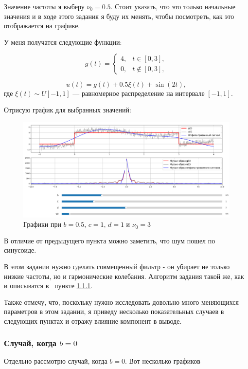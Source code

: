 \documentclass[a4paper,12pt]{article}
\begin{document}
Значение частоты я выберу \(\nu_0 = 0.5\). Стоит указать, что это только начальные значения
и в ходе этого задания я буду их менять, чтобы посмотреть, как это отображается на 
графике.

У меня получатся следующие функции:

\[
g(t) = 
\begin{cases} 
4, & t \in [0, 3], \\
0, & t \notin [0, 3],
\end{cases}
\]

\[
u(t) = g(t) + 0.5\xi(t) + \sin(2t),
\]
где \(\xi(t) \sim U[-1, 1]\) — равномерное распределение на интервале \([-1, 1]\).

Отрисую график для выбранных значений:

\begin{figure}[H]  
    \centering
    \includegraphics[width=1\textwidth]{../images/1.2.png}
    \caption{Графики при \(b = 0.5\), \(c =  1\), \(d = 1\) и \(\nu_0 = 3\)}  
    \label{fig:my_image}  
\end{figure}

В отличие от предыдущего пункта можно заметить, что шум пошел по синусоиде.

В этом задании нужно сделать совмещенный фильтр - он убирает не только низкие
частоты, но и гармонические колебания. Алгоритм задания такой же, как и описыватся в \
пункте \hyperlink{mytext}{1.1.1}.

Также отмечу, что, поскольку нужно исследовать довольно много меняющихся параметров
в этом задании, я приведу несколько показательных случаев в следующих пунктах
 и отражу влияние компонент в выводе.

\subsubsection{Случай, когда \(b = 0\)}

Отдельно рассмотрю случай, когда \(b = 0\). Вот несколько графиков
\end{document}

